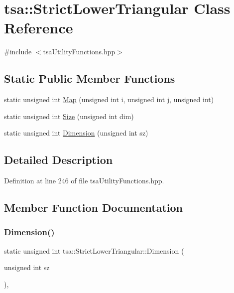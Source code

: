 \hypertarget{classtsa_1_1_strict_lower_triangular}{}\section{tsa\+:\+:Strict\+Lower\+Triangular Class Reference}
\label{classtsa_1_1_strict_lower_triangular}


{\ttfamily \#include $<$tsa\+Utility\+Functions.\+hpp$>$}

\subsection*{Static Public Member Functions}
\begin{DoxyCompactItemize}
\item 
static unsigned int \hyperlink{classtsa_1_1_strict_lower_triangular_a69fb9a803dfb8a4a9228a23ef3250e22}{Map} (unsigned int i, unsigned int j, unsigned int)
\item 
static unsigned int \hyperlink{classtsa_1_1_strict_lower_triangular_a06a17741f97088e8a67885c618368de5}{Size} (unsigned int dim)
\item 
static unsigned int \hyperlink{classtsa_1_1_strict_lower_triangular_a4147086de61984dc37416df9676626bd}{Dimension} (unsigned int sz)
\end{DoxyCompactItemize}


\subsection{Detailed Description}


Definition at line 246 of file tsa\+Utility\+Functions.\+hpp.



\subsection{Member Function Documentation}
\mbox{\label{classtsa_1_1_strict_lower_triangular_a4147086de61984dc37416df9676626bd}} 
\subsubsection{\texorpdfstring{Dimension()}{Dimension()}}
{\footnotesize\ttfamily static unsigned int tsa\+::\+Strict\+Lower\+Triangular\+::\+Dimension (\begin{DoxyParamCaption}\item[{unsigned int}]{sz }\end{DoxyParamCaption})\hspace{0.3cm}{\ttfamily [inline]}, {\ttfamily [static]}}



